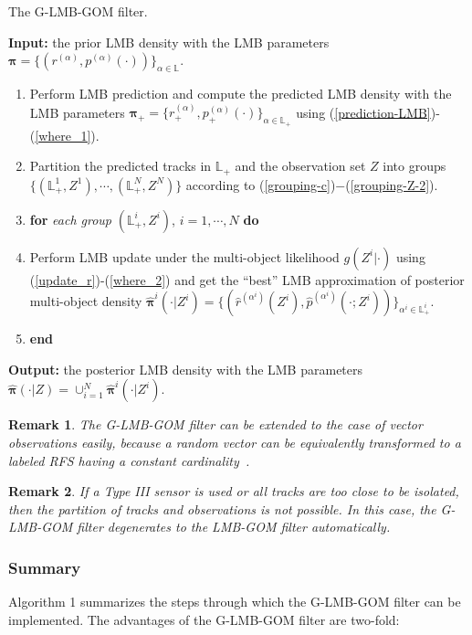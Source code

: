 \documentclass[journal]{IEEEtran}
\newcommand{\bpi}{{\boldsymbol\pi}}
\newtheorem{Rem}{Remark}
\begin{document}
{\begin{algorithm}[t]\label{algorithm: generate lgmb}
\caption{The G-LMB-GOM filter.}
\begin{minipage}{0.93\columnwidth}
{\small
\textbf{Input: } the prior LMB density with the LMB parameters $\bpi\!=\!\{(r^{(\alpha)},p^{(\alpha)}(\cdot))\}_{\alpha\in\mathbb{L}}$.  
\begin{enumerate} [$1.$]
\item  
Perform LMB prediction  and
 compute the predicted LMB density 
with the LMB parameters 
 $\bpi_+\!=\!\{r^{(\alpha)}_+,p_+^{(\alpha)}(\cdot)\}_{\alpha\in\mathbb{L}_+}$ using (\ref{prediction-LMB})-(\ref{where_1}).
\item 
Partition the predicted tracks in $\mathbb{L}_+$ and the observation set $Z$ into  groups  $\{(\mathbb{L}^{1}_+,Z^{1}),\cdots,(\mathbb{L}^{N}_+,Z^{N})\}$ according to (\ref{grouping-c})$-$(\ref{grouping-Z-2}).
\item \textbf{for }\textit{each group} $(\mathbb{L}_+^{i},Z^{i})$, $i=1,\cdots,N$ \textbf{do}

\item Perform LMB update under the multi-object likelihood $g(Z^{i}|\cdot)$ using (\ref{update_r})-(\ref{where_2}) and get the ``best'' LMB  approximation of posterior multi-object density $ \hat \bpi^{i}(\cdot|Z^{i})=\{(\hat r^{(\alpha^i)}(Z^{i}),\hat p^{(\alpha^i)}(\cdot;Z^{i}))\}_{\alpha^i\in\mathbb{L}_+^{i}}$.
\item \textbf{end}
\end{enumerate} 
\textbf{Output:} the posterior LMB density with the LMB parameters $\hat \bpi(\cdot|Z)=\cup_{i=1}^N \hat\bpi^{i}(\cdot|Z^{i})$.}
\end{minipage}
\end{algorithm}

\begin{Rem}\label{remark:8}
The G-LMB-GOM filter can be extended to the case of vector observations easily, because a random vector can be equivalently transformed to a labeled RFS having a constant cardinality~\cite{set-jpda}. 
\end{Rem} 

\begin{Rem}\label{remark:8}
If a Type III sensor is used or all tracks are too close to be isolated, then the partition of tracks and observations is not possible. In this case, the G-LMB-GOM filter degenerates to the LMB-GOM filter automatically. 
\end{Rem} 
\subsubsection{Summary}
Algorithm 1 summarizes the steps through which the G-LMB-GOM filter can be implemented.  The advantages of  the G-LMB-GOM filter are two-fold:

}
\end{document}
